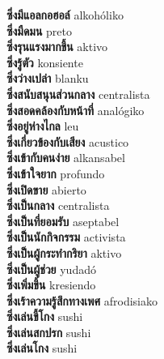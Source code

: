 \textbf{ ซึ่งมีแอลกอฮอล์  } alkohóliko \\
\textbf{ ซึ่งมืดมน  } preto \\
\textbf{ ซึ่งรุนแรงมากขึ้น  } aktivo \\
\textbf{ ซึ่งรู้ตัว  } konsiente \\
\textbf{ ซึ่งว่างเปล่า  } blanku \\
\textbf{ ซึ่งสนับสนุนส่วนกลาง  } centralista \\
\textbf{ ซึ่งสอดคล้องกับหน้าที่  } analógiko \\
\textbf{ ซึ่งอยู่ห่างไกล  } leu \\
\textbf{ ซึ่งเกี่ยวข้องกับเสียง  } acustico \\
\textbf{ ซึ่งเข้ากับคนง่าย  } alkansabel \\
\textbf{ ซึ่งเข้าใจยาก  } profundo \\
\textbf{ ซึ่งเปิดขาย  } abierto \\
\textbf{ ซึ่งเป็นกลาง  } centralista \\
\textbf{ ซึ่งเป็นที่ยอมรับ  } aseptabel \\
\textbf{ ซึ่งเป็นนักกิจกรรม  } activista \\
\textbf{ ซึ่งเป็นผู้กระทำกริยา  } aktivo \\
\textbf{ ซึ่งเป็นผู้ช่วย  } yudadó \\
\textbf{ ซึ่งเพิ่มขึ้น  } kresiendo \\
\textbf{ ซึ่งเร้าความรู้สึกทางเพศ  } afrodisiako \\
\textbf{ ซึ่งเล่นขี้โกง  } sushi \\
\textbf{ ซึ่งเล่นสกปรก  } sushi \\
\textbf{ ซึ่งเล่นโกง  } sushi \\
